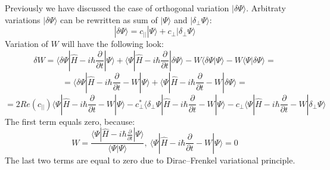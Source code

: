 Previously we have discussed the case of orthogonal variation $|\delta\Psi\rangle$. 
Arbitraty variations $|\delta\Psi\rangle$ can be rewritten as sum of $|\Psi\rangle$ and $|\delta_{\perp}\Psi\rangle$:
$$|\delta\Psi\rangle = c_{||}|\Psi\rangle + c_{\perp}|\delta_{\perp}\Psi\rangle$$
Variation of $W$ will have the following look:
$$\delta W = \langle\delta\Psi|\hat{H}-i\hbar\frac{\partial}{\partial t}|\Psi\rangle + %
	     \langle\Psi|\hat{H}-i\hbar\frac{\partial}{\partial t}|\delta\Psi\rangle - 
	     W\langle\delta\Psi|\Psi\rangle - W\langle\Psi|\delta\Psi\rangle = $$
$$ = \langle\delta\Psi|\hat{H}-i\hbar\frac{\partial}{\partial t}-W|\Psi\rangle + %
     \langle\Psi|\hat{H}-i\hbar\frac{\partial}{\partial t}-W|\delta\Psi\rangle = $$
$$ = 2\mathit{Re}(c_{||})\langle\Psi|\hat{H}-i\hbar\frac{\partial}{\partial t}-W|\Psi\rangle - %
     c_{\perp}^*\langle\delta_{\perp}\Psi|\hat{H}-i\hbar\frac{\partial}{\partial t}-W|\Psi\rangle - %
     c_{\perp}\langle\Psi|\hat{H}-i\hbar\frac{\partial}{\partial t}-W|\delta_{\perp}\Psi\rangle $$
The first term equals zero, because:
$$W = \frac{\langle\Psi|\hat{H}-i\hbar\frac{\partial}{\partial t}|\Psi\rangle}{\langle\Psi|\Psi\rangle},\ %
      \langle\Psi|\hat{H}-i\hbar\frac{\partial}{\partial t}-W|\Psi\rangle = 0$$
The last two terms are equal to zero due to Dirac--Frenkel variational principle.


